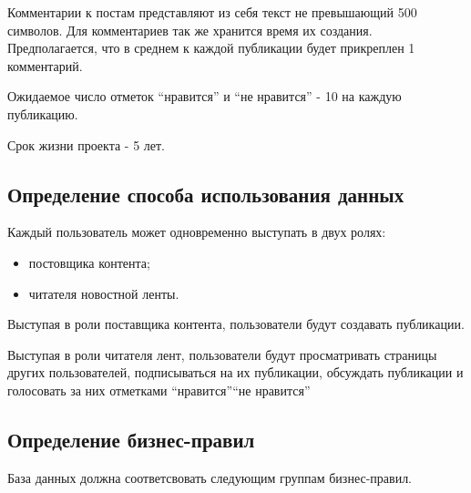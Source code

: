 Комментарии к постам представляют из себя текст не превышающий 500 символов.
Для комментариев так же хранится время их создания.
Предполагается, что в среднем к каждой публикации будет прикреплен 1 комментарий.

Ожидаемое число отметок ``нравится'' и ``не нравится'' - 10 на каждую публикацию.

Срок жизни проекта - 5 лет.

\subsection{Определение способа использования данных}

Каждый пользователь может одновременно выступать в двух ролях:
\begin{itemize}
\item постовщика контента;
\item читателя новостной ленты.
\end{itemize}

Выступая в роли поставщика контента, пользователи будут создавать публикации.

Выступая в роли читателя лент, пользователи будут просматривать страницы других пользователей,
подписываться на их публикации, обсуждать публикации и голосовать за них отметками ``нравится''\/``не нравится''



\subsection{Определение бизнес-правил}
База данных должна соответсвовать следующим группам бизнес-правил.

